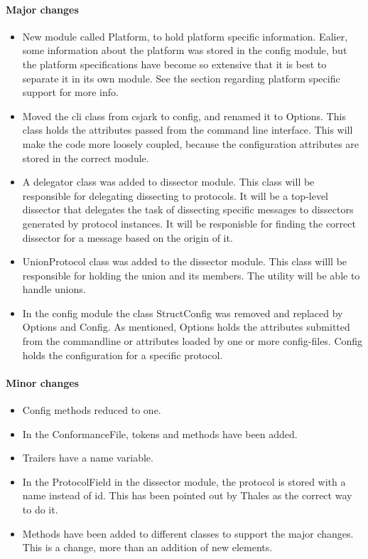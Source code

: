 \paragraph{Major changes}
\begin{itemize}
\item New module called Platform, to hold platform specific information. Ealier, some information about the platform was stored in the config module, but the platform specifications have become so extensive that it is best to separate it in its own module. See the section regarding platform specific support for more info.
\item Moved the \gls{cli} class from csjark to config, and renamed it to Options. This class holds the attributes passed from the command line interface. This will make the code more loosely coupled, because the configuration attributes are stored in the correct module. 
\item A delegator class was added to \gls{dissector} module. This class will be responsible for delegating dissecting to \glspl{protocol}. It will be a top-level \gls{dissector} that delegates the task of dissecting specific messages to \glspl{dissector} generated by \gls{protocol} instances. It will be responisble for finding the correct \gls{dissector} for a message based on the origin of it.
\item UnionProtocol class was added to the \gls{dissector} module. This class willl be responsible for holding the \gls{union} and its \glspl{member}. The \gls{utility} will be able to handle \glspl{union}. 
\item In the config module the class StructConfig was removed and replaced by Options and Config. As mentioned, Options holds the attributes submitted from the commandline or attributes loaded by one or more config-files. Config holds the configuration for a specific \gls{protocol}.

\end{itemize}

\paragraph{Minor changes}
\begin{itemize}
\item Config methods reduced to one.
\item In the ConformanceFile, tokens and methods have been added.
\item Trailers have a name variable.
\item In the ProtocolField in the \gls{dissector} module, the \gls{protocol} is stored with a name instead of id. This has been pointed out by Thales as the correct way to do it.
\item Methods have been added to different classes to support the major changes. This is a change, more than an addition of new elements. 
\end{itemize}

